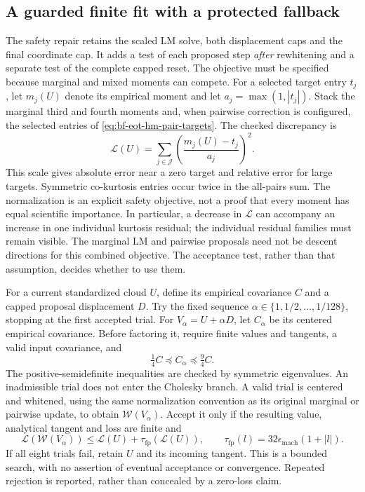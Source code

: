 \subsection{A guarded finite fit with a protected fallback}
\label{sec:bf-eot-hm-guarded-fit}

The safety repair retains the scaled LM solve, both displacement caps and the
final coordinate cap.  It adds a test of each proposed step \emph{after}
rewhitening and a separate test of the complete capped reset.  The objective
must be specified because marginal and mixed moments can compete.  For a
selected target entry \(t_j\), let \(m_j(U)\) denote its empirical moment and
let \(a_j=\max(1,|t_j|)\).  Stack the marginal third and fourth moments and,
when pairwise correction is configured, the selected entries of
\eqref{eq:bf-eot-hm-pair-targets}.  The checked discrepancy is
\begin{equation}
 \mathcal L(U)=\sum_{j\in\mathcal J}
        \left(\frac{m_j(U)-t_j}{a_j}\right)^2.
 \label{eq:bf-eot-hm-guard-loss}
\end{equation}
This scale gives absolute error near a zero target and relative error for
large targets.  Symmetric co-kurtosis entries occur twice in the all-pairs
sum.  The normalization is an explicit safety objective, not a proof that
every moment has equal scientific importance.  In particular, a decrease in
\(\mathcal L\) can accompany an increase in one individual kurtosis residual;
the individual residual families must remain visible.  The marginal LM and
pairwise proposals need not be descent directions for this combined objective.
The acceptance test, rather than that assumption, decides whether to use them.

For a current standardized cloud \(U\), define its empirical covariance \(C\)
and a capped proposal displacement \(D\).  Try the fixed sequence
\(\alpha\in\{1,1/2,\ldots,1/128\}\), stopping at the first accepted trial.
For \(V_\alpha=U+\alpha D\), let \(C_\alpha\) be its centered empirical
covariance.  Before factoring it, require finite values and tangents, a valid
input covariance, and
\begin{equation}
 \tfrac14 C\preceq C_\alpha\preceq\tfrac94 C.
 \label{eq:bf-eot-hm-guard-covariance}
\end{equation}
The positive-semidefinite inequalities are checked by symmetric eigenvalues.
An inadmissible trial does not enter the Cholesky branch.  A valid trial is
centered and whitened, using the same normalization convention as its original
marginal or pairwise update, to obtain \(\mathcal W(V_\alpha)\).  Accept it only
if the resulting value, analytical tangent and loss are finite and
\begin{equation}
 \mathcal L(\mathcal W(V_\alpha))
       \le\mathcal L(U)+\tau_{\mathrm{fp}}(\mathcal L(U)),\qquad
 \tau_{\mathrm{fp}}(l)=32\epsilon_{\mathrm{mach}}(1+|l|).
 \label{eq:bf-eot-hm-guard-acceptance}
\end{equation}
If all eight trials fail, retain \(U\) and its incoming tangent.  This is a
bounded search, with no assertion of eventual acceptance or convergence.
Repeated rejection is reported, rather than concealed by a zero-loss claim.


